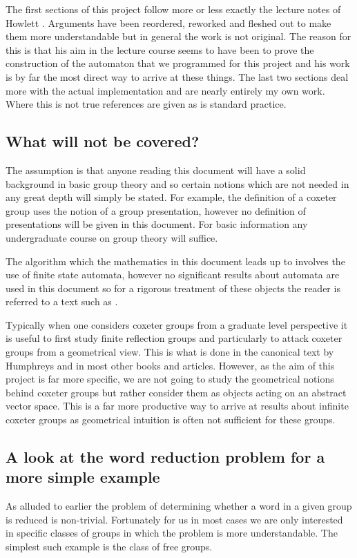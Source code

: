 \documentclass[a4paper,12pt]{article}
\begin{document}
The first sections of this project follow more or less exactly the lecture notes of Howlett \cite{howlettnotes}. Arguments have been reordered, reworked and fleshed out to make them more understandable but in general the work is not original. The reason for this is that his aim in the lecture course seems to have been to prove the construction of the automaton that we programmed for this project and his work is by far the most direct way to arrive at these things. The last two sections deal more with the actual implementation and are nearly entirely my own work. Where this is not true references are given as is standard practice.

\subsection{What will not be covered?}
The assumption is that anyone reading this document will have a solid background in basic group theory and so certain notions which are not needed in any great depth will simply be stated. For example, the definition of a coxeter group uses the notion of a group presentation, however no definition of presentations will be given in this document. For basic information any undergraduate course on group theory will suffice.

The algorithm which the mathematics in this document leads up to involves the use of finite state automata, however no significant results about automata are used in this document so for a rigorous treatment of these objects the reader is referred to a text such as \cite{automata}.

Typically when one considers coxeter groups from a graduate level perspective it is useful to first study finite reflection groups and particularly to attack coxeter groups from a geometrical view. This is what is done in the canonical text by Humphreys \cite{humphreys90} and in most other books and articles. However, as the aim of this project is far more specific, we are not going to study the geometrical notions behind coxeter groups but rather consider them as objects acting on an abstract vector space. This is a far more productive way to arrive at results about infinite coxeter groups as geometrical intuition is often not sufficient for these groups.

\subsection{A look at the word reduction problem for a more simple example}
As alluded to earlier the problem of determining whether a word in a given group is reduced is non-trivial. Fortunately for us in most cases we are only interested in specific classes of groups in which the problem is more understandable. The simplest such example is the class of free groups.
\end{document}
